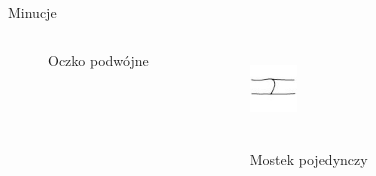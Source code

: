 \documentclass{beamer}
\begin{document}
\begin{frame}{Minucje}
\begin{columns}
\begin{figure}[t]
                \caption*{Oczko podwójne}
            \end{figure}
            \begin{figure}[t]
			    \centering
                \includegraphics[width=0.4\textwidth]{fingerprints/minucje/mostek1.jpg}\\~\
                \caption*{Mostek pojedynczy}
            \end{figure}
    \end{columns}
    

\end{frame}
\end{document}
